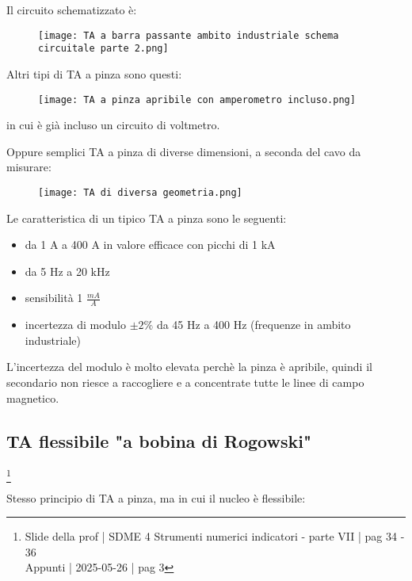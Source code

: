 Il circuito schematizzato è: 

\begin{figure}[h]
    \centering
    \texttt{[image: TA a barra passante ambito industriale schema circuitale parte 2.png]}
\end{figure}

Altri tipi di TA a pinza sono questi: 

\begin{figure}[h]
    \centering
    \texttt{[image: TA a pinza apribile con amperometro incluso.png]}
\end{figure}

in cui è già incluso un circuito di voltmetro. \newline 

Oppure semplici TA a pinza di diverse dimensioni, a seconda del cavo da misurare: 

\newpage 

\begin{figure}[h]
    \centering
    \texttt{[image: TA di diversa geometria.png]}
\end{figure}

Le caratteristica di un tipico TA a pinza sono le seguenti: 

\begin{itemize}
    \item da 1 A a 400 A in valore efficace con picchi di 1 kA
    \item da 5 Hz a 20 kHz 
    \item sensibilità 1 $\frac{mA}{A}$ 
    \item incertezza di modulo $\pm 2 \% $ da 45 Hz a 400 Hz (frequenze in ambito industriale)
\end{itemize}

L'incertezza del modulo è molto elevata perchè la pinza è apribile, quindi il secondario non riesce a raccogliere e a concentrate tutte le linee di campo magnetico. \newline 

\newpage 

\subsection{TA flessibile "a bobina di Rogowski"}
\footnote{Slide della prof | SDME 4 Strumenti numerici indicatori - parte VII | pag 34 - 36\\  
Appunti | 2025-05-26 | pag 3}

Stesso principio di TA a pinza, ma in cui il nucleo è flessibile: 

